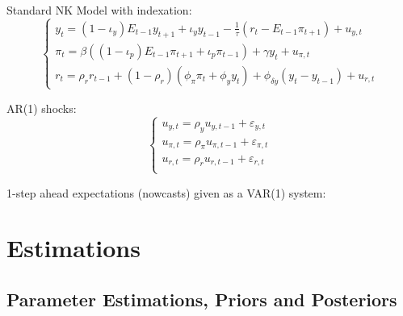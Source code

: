 \documentclass[12pt]{article}
\numberwithin{equation}{section}
\begin{document}
Standard NK Model with indexation: 
\begin{equation}
\begin{cases}
	y_t = (1-\iota_y) E_{t-1} y_{t+1} +\iota_y y_{t-1} - \frac{1}{\tau}(r_t - E_{t-1} \pi_{t+1}) + u_{y,t} \\

\pi_t = \beta  ((1-\iota_p) E_{t-1} \pi_{t+1} + \iota_p \pi_{t-1}) + \gamma y_t  + u_{\pi,t}\\
r_t = \rho_r r_{t-1} + (1-\rho_r) (\phi_{\pi} \pi_t + \phi_y y_t) + \phi_{\delta y} (y_t - y_{t-1}) +u_{r,t}
\end{cases}
\end{equation}

AR(1) shocks: 
\begin{equation}
\begin{cases}
u_{y,t} = \rho_y u_{y,t-1} + \varepsilon_{y,t} \\
u_{\pi,t} = \rho_{\pi} u_{\pi,t-1} + \varepsilon_{\pi,t} \\
u_{r,t} = \rho_r u_{r,t-1} + \varepsilon_{r,t} \\

\end{cases}
\end{equation}

1-step ahead expectations (nowcasts) given as a VAR(1) system: 




\section{Estimations}

\subsection{Parameter Estimations, Priors and Posteriors}
\end{document}
